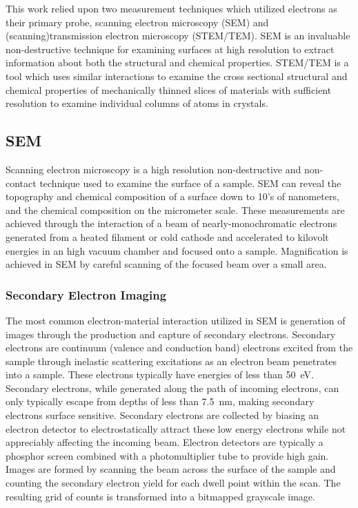 This work relied upon two measurement techniques which utilized electrons as their primary probe, scanning electron microscopy (SEM) and (scanning)transmission electron microscopy (STEM/TEM).
SEM is an invaluable non-destructive technique for examining surfaces at high resolution to extract information about both the structural and chemical properties.
STEM/TEM is a tool which uses similar interactions to examine the cross sectional structural and chemical properties of mechanically thinned slices of materials with sufficient resolution to examine individual columns of atoms in crystals.
\subsection{SEM} Scanning electron microscopy is a high resolution non-destructive and non-contact technique used to examine the surface of a sample.
SEM can reveal the topography and chemical composition of a surface down to 10's of nanometers, and the chemical composition on the micrometer scale.
These measurements are achieved through the interaction of a beam of nearly-monochromatic electrons generated from a heated filament or cold cathode and accelerated to kilovolt energies in an high vacuum chamber and focused onto a sample.
Magnification is achieved in SEM by careful scanning of the focused beam over a small area.

\subsubsection{Secondary Electron Imaging} The most common electron-material interaction utilized in SEM is generation of images through the production and capture of secondary electrons.
Secondary electrons are continuum (valence and conduction band) electrons excited from the sample through inelastic scattering excitations as an electron beam penetrates into a sample.
These electrons typically have energies of less than 50~eV\cite{goldstein2003scanning}.
Secondary electrons, while generated along the path of incoming electrons, can only typically escape from depths of less than 7.5~nm, making secondary electrons surface sensitive\cite{goldstein2003scanning}.
Secondary electrons are collected by biasing an electron detector to electrostatically attract these low energy electrons while not appreciably affecting the incoming beam.
Electron detectors are typically a phosphor screen combined with a photomultiplier tube to provide high gain.
Images are formed by scanning the beam across the surface of the sample and counting the secondary electron yield for each dwell point within the scan.
The resulting grid of counts is transformed into a bitmapped grayscale image.

